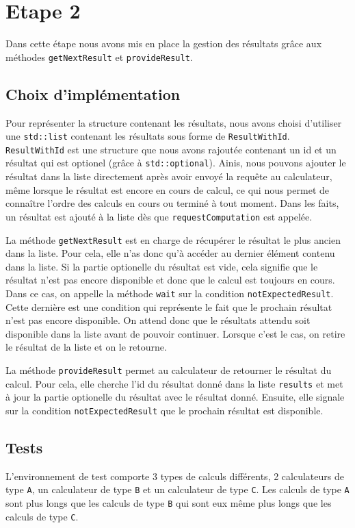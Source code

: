 \documentclass{article}
\begin{document}
\section{Etape 2}
Dans cette étape nous avons mis en place la gestion des résultats grâce aux méthodes \texttt{getNextResult} et
\texttt{provideResult}.

\subsection{Choix d'implémentation}
Pour représenter la structure contenant les résultats, nous avons choisi d'utiliser une \texttt{std::list} contenant les
résultats sous forme de \texttt{ResultWithId}. \texttt{ResultWithId} est une structure que nous avons rajoutée
contenant un id et un résultat qui est optionel (grâce à \texttt{std::optional}). Ainis, nous pouvons ajouter le
résultat dans la liste directement après avoir envoyé la requête au calculateur, même lorsque le résultat est encore
en cours de calcul, ce qui nous permet de connaître l'ordre des calculs en cours ou terminé à tout moment. Dans les
faits, un résultat est ajouté à la liste dès que \texttt{requestComputation} est appelée.

La méthode \texttt{getNextResult} est en charge de récupérer le résultat le plus ancien dans la liste. Pour cela, elle
n'as donc qu'à accéder au dernier élément contenu dans la liste. Si la partie optionelle du résultat est vide, cela
signifie que le résultat n'est pas encore disponible et donc que le calcul est toujours en cours. Dans ce cas, on
appelle la méthode \texttt{wait} sur la condition \texttt{notExpectedResult}. Cette dernière est une condition qui
représente le fait que le prochain résultat n'est pas encore disponible. On attend donc que le résultats attendu
soit disponible dans la liste avant de pouvoir continuer. Lorsque c'est le cas, on retire le résultat de la liste et
on le retourne.

La méthode \texttt{provideResult} permet au calculateur de retourner le résultat du calcul. Pour cela, elle cherche
l'id du résultat donné dans la liste \texttt{results} et met à jour la partie optionelle du résultat avec le résultat
donné. Ensuite, elle signale sur la condition \texttt{notExpectedResult} que le prochain résultat est disponible.


\subsection{Tests}
L'environnement de test comporte 3 types de calculs différents, 2 calculateurs de type \texttt{A}, un
calculateur de type \texttt{B} et un calculateur de type \texttt{C}. Les calculs de type \texttt{A} sont plus longs
que les calculs de type \texttt{B} qui sont eux même plus longs que les calculs de type \texttt{C}.
\end{document}
